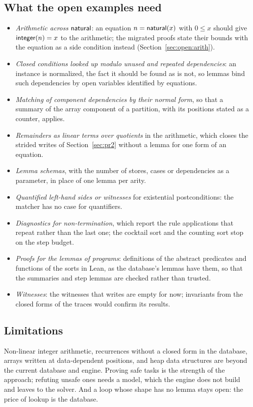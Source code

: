 \subsection{What the open examples need}
\begin{itemize}[nosep]
\item \emph{Arithmetic across $\mathsf{natural}$}: an equation $n = \mathsf{natural}(x)$ with $0 \le x$ should give $\mathsf{integer}(n) = x$ to the
  arithmetic; the migrated proofs state their bounds with the equation as a side condition instead
  (Section~\ref{sec:open:arith}).
\item \emph{Closed conditions looked up modulo unused and repeated dependencies}: an instance is normalized, the fact
  it should be found as is not, so lemmas bind such dependencies by open variables identified by equations.
\item \emph{Matching of component dependencies by their normal form}, so that a summary of the array component of a
  partition, with its positions stated as a counter, applies.
\item \emph{Remainders as linear terms over quotients} in the arithmetic, which closes the strided writes of
  Section~\ref{sec:pr2} without a lemma for one form of an equation.
\item \emph{Lemma schemas}, with the number of stores, cases or dependencies as a parameter, in place of one lemma per
  arity.
\item \emph{Quantified left-hand sides or witnesses} for existential postconditions: the matcher has no case for
  quantifiers.
\item \emph{Diagnostics for non-termination}, which report the rule applications that repeat rather than the last one;
  the cocktail sort and the counting sort stop on the step budget.
\item \emph{Proofs for the lemmas of programs}: definitions of the abstract predicates and functions of the sorts in
  Lean, as the database's lemmas have them, so that the summaries and step lemmas are checked rather than trusted.
\item \emph{Witnesses}: the witnesses that \cuvee{} writes are empty for now; invariants from the closed forms of the
  traces would confirm its results.
\end{itemize}

\subsection{Limitations}
Non-linear integer arithmetic, recurrences without a closed form in the database, arrays written at data-dependent
positions, and heap data structures are beyond the current database and engine. Proving safe tasks is the strength of
the approach; refuting unsafe ones needs a model, which the engine does not build and leaves to the solver. And a loop
whose shape has no lemma stays open: the price of lookup is the database.
